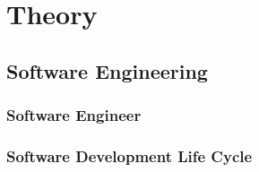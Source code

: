 

\chapter{Theory}
\label{cha:theory}


\section{Software Engineering}
\label{sec:software_engineering}




\subsection{Software Engineer}
\label{subsec:software_engineer}



\subsection{Software Development Life Cycle}
\label{subsec:sdlc}




